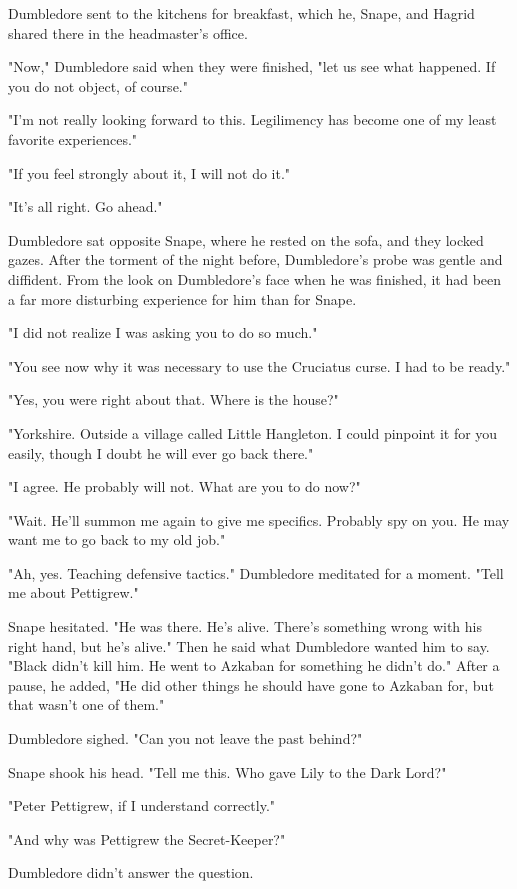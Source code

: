Dumbledore sent to the kitchens for breakfast, which he, Snape, and Hagrid shared there in the headmaster's office.

"Now," Dumbledore said when they were finished, "let us see what happened. If you do not object, of course."

"I'm not really looking forward to this. Legilimency has become one of my least favorite experiences."

"If you feel strongly about it, I will not do it."

"It's all right. Go ahead."

Dumbledore sat opposite Snape, where he rested on the sofa, and they locked gazes. After the torment of the night before, Dumbledore's probe was gentle and diffident. From the look on Dumbledore's face when he was finished, it had been a far more disturbing experience for him than for Snape.

"I did not realize I was asking you to do so much."

"You see now why it was necessary to use the Cruciatus curse. I had to be ready."

"Yes, you were right about that. Where is the house?"

"Yorkshire. Outside a village called Little Hangleton. I could pinpoint it for you easily, though I doubt he will ever go back there."

"I agree. He probably will not. What are you to do now?"

"Wait. He'll summon me again to give me specifics. Probably spy on you. He may want me to go back to my old job."

"Ah, yes. Teaching defensive tactics." Dumbledore meditated for a moment. "Tell me about Pettigrew."

Snape hesitated. "He was there. He's alive. There's something wrong with his right hand, but he's alive." Then he said what Dumbledore wanted him to say. "Black didn't kill him. He went to Azkaban for something he didn't do." After a pause, he added, "He did other things he should have gone to Azkaban for, but that wasn't one of them."

Dumbledore sighed. "Can you not leave the past behind?"

Snape shook his head. "Tell me this. Who gave Lily to the Dark Lord?"

"Peter Pettigrew, if I understand correctly."

"And why was Pettigrew the Secret-Keeper?"

Dumbledore didn't answer the question.

